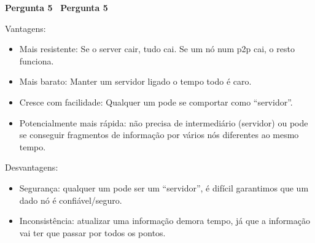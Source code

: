 \documentclass{article}
\newcounter{exe-list}
\newenvironment{exe}[2][Problema]
    {\newcommand{\opt}{(Opcional)}%
    \newcommand{\sketch}[1]{{\bfseries Rascunho:} ##1}%
    \medskip\par\noindent\ifthenelse{\equal{#1}{}}
        {\textbf{\large #2}}
        {\textbf{\large #1~#2}}%
    \medskip\par\noindent}
    {\medskip}
\begin{document}
\begin{exe}[]{Pergunta 5}
    Vantagens:
    \begin{itemize}
        \item Mais resistente:
            Se o server cair, tudo cai.
            Se um nó num p2p cai, o resto funciona.
        \item Mais barato:
            Manter um servidor ligado o tempo todo é caro.
        \item Cresce com facilidade:
            Qualquer um pode se comportar como ``servidor''.
        \item Potencialmente mais rápida:
            não precisa de intermediário (servidor) ou
            pode se conseguir fragmentos de informação
            por vários nós diferentes ao mesmo tempo.
    \end{itemize}
    Desvantagens:
    \begin{itemize}
        \item Segurança:
            qualquer um pode ser um ``servidor'',
            é difícil garantimos que um dado nó é confiável/seguro.
        \item Inconsistência:
            atualizar uma informação demora tempo,
            já que a informação vai ter que passar por todos
            os pontos.
    \end{itemize}
\end{exe}
\end{document}
